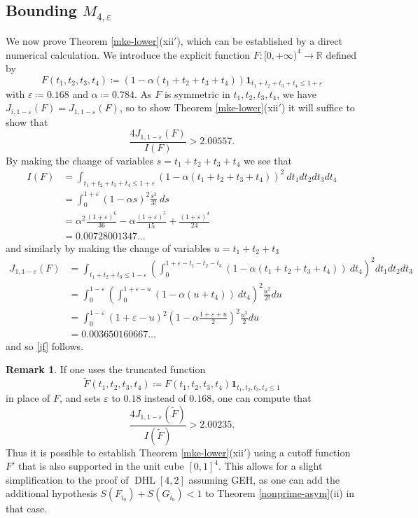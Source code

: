 \documentclass{bmcart}
\DeclareMathOperator*\DHL{DHL}
\theoremstyle{plain}
\theoremstyle{definition}
\newtheorem{remark}[theorem]{Remark}
\newcommand\R{\mathbb{R}}
\newcommand\eps{\varepsilon}
\newcommand{\onef}{\mathbf{1}}
\begin{document}
\subsection{Bounding \texorpdfstring{$M_{4,\eps}$}{M4,0.18}}\label{4d}

We now prove Theorem \ref{mke-lower}(xii$'$), which can be established by a direct numerical calculation.  We introduce the explicit function $F: [0,+\infty)^4 \to \R$ defined by
$$ F(t_1,t_2,t_3,t_4) \coloneqq (1 - \alpha (t_1+t_2+t_3+t_4)) \onef_{t_1+t_2+t_3+t_4 \leq 1+\eps}$$
with $\eps \coloneqq 0.168$ and $\alpha \coloneqq 0.784$.  As $F$ is symmetric in $t_1,t_2,t_3,t_4$, we have $J_{i,1-\eps}(F) = J_{1,1-\eps}(F)$, so to show Theorem \ref{mke-lower}(xii$'$) it will suffice to show that
\begin{equation}\label{jf}
 \frac{4 J_{1,1-\eps}(F)}{I(F)} > 2.00557.
\end{equation}
By making the change of variables $s=t_1+t_2+t_3+t_4$ we see that
\begin{align*}
I(F) &= \int_{t_1+t_2+t_3+t_4 \leq 1+\eps} (1-\alpha(t_1+t_2+t_3+t_4))^2\ dt_1 dt_2 dt_3 dt_4 \\
&= \int_0^{1+\eps} (1-\alpha s)^2 \frac{s^3}{3!}\ ds\\
&= \alpha^2 \frac{(1+\eps)^6}{36} - \alpha \frac{(1+\eps)^5}{15} + \frac{(1+\eps)^4}{24} \\
&= 0.00728001347\dots
\end{align*}
and similarly by making the change of variables $u = t_1+t_2+t_3$
\begin{align*}
J_{1,1-\eps}(F) &= \int_{t_1+t_2+t_3 \leq 1-\eps} (\int_0^{1+\eps-t_1-t_2-t_3} (1-\alpha(t_1+t_2+t_3+t_4))\ dt_4)^2 dt_1 dt_2 dt_3 \\
&= \int_0^{1-\eps} (\int_0^{1+\eps-u} (1-\alpha(u+t_4))\ dt_4)^2 \frac{u^2}{2!} du \\
&= \int_0^{1-\eps} (1+\eps-u)^2 (1-\alpha \frac{1+\eps+u}{2})^2 \frac{u^2}{2} du  \\
&= 0.003650160667\dots
\end{align*}
and so \eqref{jf} follows.

\begin{remark}  If one uses the truncated function
$$ \tilde F(t_1,t_2,t_3,t_4) \coloneqq F(t_1,t_2,t_3,t_4) \onef_{t_1,t_2,t_3,t_4 \leq 1}$$
in place of $F$, and sets $\eps$ to $0.18$ instead of $0.168$, one can compute that
$$ \frac{4 J_{1,1-\eps}(\tilde F)}{I(\tilde F)} > 2.00235.$$
Thus it is possible to establish Theorem \ref{mke-lower}(xii$'$) using a cutoff function $F'$ that is also supported in the unit cube $[0,1]^4$.  This allows for a slight simplification to the proof of $\DHL[4,2]$ assuming GEH, as one can add the additional hypothesis $S(F_{i_0})+S(G_{i_0}) < 1$ to Theorem \ref{nonprime-asym}(ii) in that case.
\end{remark}
\end{document}
